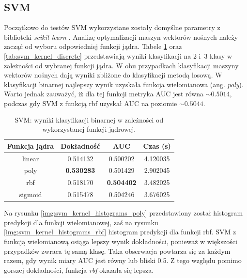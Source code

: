 \documentclass[a4paper, twoside, 11pt, openright]{article}
\begin{document}
\subsection{SVM}

Początkowo do testów SVM wykorzystane zostały domyślne parametry z biblioteki \textit{scikit-learn} \cite{bib:sklearnsvm}. Analizę optymalizacji maszyn wektorów nośnych należy zacząć od wyboru odpowiedniej funkcji jądra. Tabele \ref{tab:svm_kernel_binary} oraz \ref{tab:svm_kernel_discrete} przedstawiają wyniki klasyfikacji na 2 i~3 klasy w zależności od wybranej funkcji jądra. W obu przypadkach klasyfikacji maszyny wektorów nośnych dają wyniki zbliżone do klasyfikacji metodą losową. W klasyfikacji binarnej najlepszy wynik uzyskała funkcja wielomianowa (ang. \textit{poly}). Warto jednak zauważyć, iż dla tej funkcji metryka AUC jest równa $\sim 0.5014$, podczas gdy SVM z funkcją rbf uzyskał AUC na poziomie $\sim 0.5044$.

\begin{table}[H]
    \centering
    \begin{tabular}{|c|c|c|c|}
    \hline
        \textbf{Funkcja jądra} & \textbf{Dokładność} & \textbf{AUC} & \textbf{Czas (s)} \\ \hline
linear  &  0.514132 &  0.500202 &    4.120035 \\ \hline
poly    &  \textbf{0.530283} &  0.501429 &    2.902045 \\ \hline
rbf     &  0.518170 &  \textbf{0.504402} &    3.482025 \\ \hline
sigmoid &  0.515478 &  0.504246 &    3.676025 \\ \hline
    \end{tabular}
    \caption{SVM: wyniki klasyfikacji binarnej w zależności od wykorzystanej funkcji jądrowej.}
    \label{tab:svm_kernel_binary}
\end{table}

 Na rysunku \ref{img:svm_kernel_histograms_poly} przedstawiony został histogram predykcji dla funkcji wielomianowej, zaś na rysunku \ref{img:svm_kernel_histograms_rbf} histogram predykcji dla funkcji rbf. SVM z funkcją wielomianową osiąga lepszy wynik dokładności, ponieważ w większości przypadków zwraca tę samą klasę. Taka obserwacja powtarza się za każdym razem, gdy wynik miary AUC jest równy lub bliski 0.5. Z tego względu pomimo gorszej dokładności, funkcja \textit{rbf} okazała się lepsza.
\end{document}
